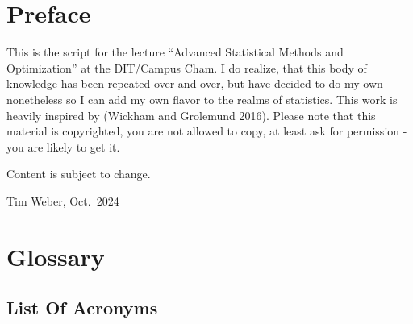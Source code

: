 \documentclass[
  a4paper,
]{scrbook}
\renewcommand*\contentsname{Table of contents}
\newcommand\contentsname{Table of contents}
\begin{document}

\renewcommand*\contentsname{Table of contents}
{
\setcounter{tocdepth}{1}
\tableofcontents
}
\listoffigures
\listoftables

\mainmatter
{}

\chapter*{Preface}\label{preface}


This is the script for the lecture ``Advanced Statistical Methods and
Optimization'' at the DIT/Campus Cham. I do realize, that this body of
knowledge has been repeated over and over, but have decided to do my own
nonetheless so I can add my own flavor to the realms of statistics. This
work is heavily inspired by (Wickham and Grolemund 2016). Please note
that this material is copyrighted, you are not allowed to copy, at least
ask for permission - you are likely to get it.

Content is subject to change.

Tim Weber, Oct.~2024


\chapter*{Glossary}\label{glossary}


\section*{List Of Acronyms}\label{acronyms_HEADER_LOA}

\end{document}
